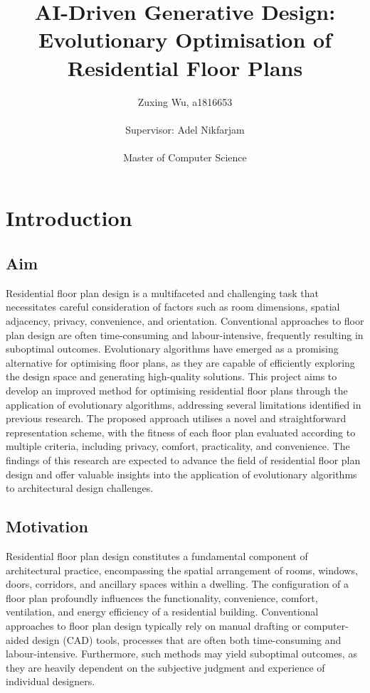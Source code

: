 \documentclass[]{article}
\title{\textbf{AI-Driven Generative Design: Evolutionary Optimisation of Residential Floor Plans}}
\author{Zuxing Wu, a1816653\\ \\Supervisor: Adel Nikfarjam\\ \\Master of Computer Science}
\begin{document}
\maketitle\nonumber

\newpage\nonumber

\tableofcontents

\newpage


\section{Introduction}
\subsection{Aim}
Residential floor plan design is a multifaceted and challenging task that necessitates careful consideration of factors such as room dimensions, spatial adjacency, privacy, convenience, and orientation. Conventional approaches to floor plan design are often time-consuming and labour-intensive, frequently resulting in suboptimal outcomes. Evolutionary algorithms have emerged as a promising alternative for optimising floor plans, as they are capable of efficiently exploring the design space and generating high-quality solutions. This project aims to develop an improved method for optimising residential floor plans through the application of evolutionary algorithms, addressing several limitations identified in previous research. The proposed approach utilises a novel and straightforward representation scheme, with the fitness of each floor plan evaluated according to multiple criteria, including privacy, comfort, practicality, and convenience. The findings of this research are expected to advance the field of residential floor plan design and offer valuable insights into the application of evolutionary algorithms to architectural design challenges.

\subsection{Motivation}
Residential floor plan design constitutes a fundamental component of architectural practice, encompassing the spatial arrangement of rooms, windows, doors, corridors, and ancillary spaces within a dwelling. The configuration of a floor plan profoundly influences the functionality, convenience, comfort, ventilation, and energy efficiency of a residential building. Conventional approaches to floor plan design typically rely on manual drafting or computer-aided design (CAD) tools, processes that are often both time-consuming and labour-intensive. Furthermore, such methods may yield suboptimal outcomes, as they are heavily dependent on the subjective judgment and experience of individual designers.
\end{document}
